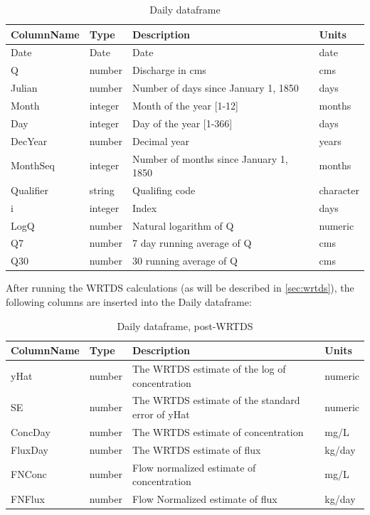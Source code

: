 \documentclass[a4paper,11pt]{article}
\begin{document}
\begin{table}[!ht]
\begin{center}
\caption{Daily dataframe}
\label{table:Daily1}
\begin{tabular}{llll}
  \hline
ColumnName & Type & Description & Units \\ 
  \hline
Date & Date & Date & date \\ 
  Q & number & Discharge in cms & cms \\ 
  Julian & number & Number of days since January 1, 1850 & days \\ 
  Month & integer & Month of the year [1-12] & months \\ 
  Day & integer & Day of the year [1-366] & days \\ 
  DecYear & number & Decimal year & years \\ 
  MonthSeq & integer & Number of months since January 1, 1850 & months \\ 
  Qualifier & string & Qualifing code & character \\ 
  i & integer & Index & days \\ 
  LogQ & number & Natural logarithm of Q & numeric \\ 
  Q7 & number & 7 day running average of Q & cms \\ 
  Q30 & number & 30 running average of Q & cms \\ 
   \hline
\end{tabular}
\end{center}
\end{table}
After running the WRTDS calculations (as will be described in \ref{sec:wrtds}), the following columns are inserted into the Daily dataframe:

\begin{table}[!ht]
\begin{center}
\caption{Daily dataframe, post-WRTDS}
\label{table:Daily2}
\begin{tabular}{llll}
  \hline
ColumnName & Type & Description & Units \\ 
  \hline
yHat & number & The WRTDS estimate of the log of concentration & numeric \\ 
  SE & number & The WRTDS estimate of the standard error of yHat & numeric \\ 
  ConcDay & number & The WRTDS estimate of concentration & mg/L \\ 
  FluxDay & number & The WRTDS estimate of flux & kg/day \\ 
  FNConc & number & Flow normalized estimate of concentration & mg/L \\ 
  FNFlux & number & Flow Normalized estimate of flux & kg/day \\ 
   \hline
\end{tabular}
\end{center}
\end{table}
\FloatBarrier
\end{document}

